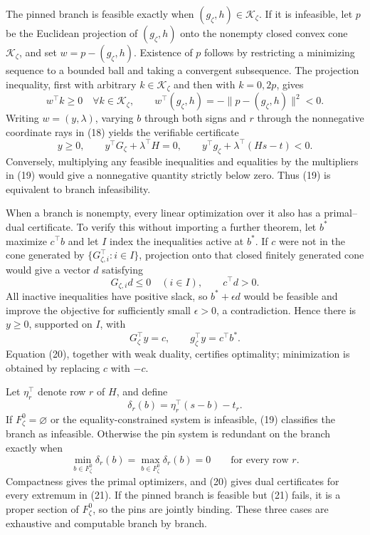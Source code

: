 The pinned branch is feasible exactly when \((g_{\zeta},h)\in\mathcal K_{\zeta}\).  If it is infeasible, let \(p\) be the Euclidean projection of \((g_{\zeta},h)\) onto the nonempty closed convex cone \(\mathcal K_{\zeta}\), and set \(w=p-(g_{\zeta},h)\).  Existence of \(p\) follows by restricting a minimizing sequence to a bounded ball and taking a convergent subsequence.  The projection inequality, first with arbitrary \(k\in\mathcal K_{\zeta}\) and then with \(k=0,2p\), gives
\[
 w^{\top}k\ge0\quad\forall k\in\mathcal K_{\zeta},
 \qquad
 w^{\top}(g_{\zeta},h)=-\|p-(g_{\zeta},h)\|^2<0.
\]
Writing \(w=(y,\lambda)\), varying \(b\) through both signs and \(r\) through the nonnegative coordinate rays in (18) yields the verifiable certificate
\[
 y\ge0,
 \qquad
 y^{\top}G_{\zeta}+\lambda^{\top}H=0,
 \qquad
 y^{\top}g_{\zeta}+\lambda^{\top}(Hs-t)<0.
\tag{19}
\]
Conversely, multiplying any feasible inequalities and equalities by the multipliers in (19) would give a nonnegative quantity strictly below zero.  Thus (19) is equivalent to branch infeasibility.

When a branch is nonempty, every linear optimization over it also has a primal--dual certificate.  To verify this without importing a further theorem, let \(b^*\) maximize \(c^{\top}b\) and let \(I\) index the inequalities active at \(b^*\).  If \(c\) were not in the cone generated by \(\{G_{\zeta,i}^{\top}:i\in I\}\), projection onto that closed finitely generated cone would give a vector \(d\) satisfying
\[
 G_{\zeta,i}d\le0\quad(i\in I),
 \qquad c^{\top}d>0.
\]
All inactive inequalities have positive slack, so \(b^*+\epsilon d\) would be feasible and improve the objective for sufficiently small \(\epsilon>0\), a contradiction.  Hence there is \(y\ge0\), supported on \(I\), with
\[
 G_{\zeta}^{\top}y=c,
 \qquad
 g_{\zeta}^{\top}y=c^{\top}b^*.
\tag{20}
\]
Equation (20), together with weak duality, certifies optimality; minimization is obtained by replacing \(c\) with \(-c\).

Let \(\eta_r^{\top}\) denote row \(r\) of \(H\), and define
\[
 \delta_r(b)=\eta_r^{\top}(s-b)-t_r.
\]
If \(F_{\zeta}^0=\varnothing\) or the equality-constrained system is infeasible, (19) classifies the branch as infeasible.  Otherwise the pin system is redundant on the branch exactly when
\[
 \min_{b\in F_{\zeta}^0}\delta_r(b)
 =\max_{b\in F_{\zeta}^0}\delta_r(b)=0
 \qquad\text{for every row }r.
\tag{21}
\]
Compactness gives the primal optimizers, and (20) gives dual certificates for every extremum in (21).  If the pinned branch is feasible but (21) fails, it is a proper section of \(F_{\zeta}^0\), so the pins are jointly binding.  These three cases are exhaustive and computable branch by branch.

